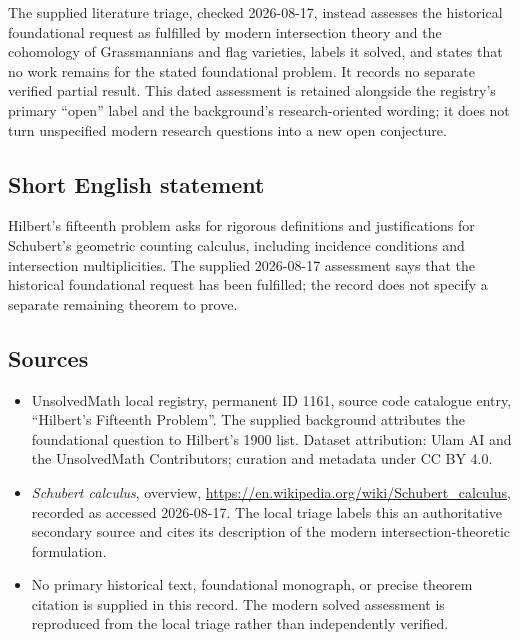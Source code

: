 \documentclass[11pt]{article}
\begin{document}
The supplied literature triage, checked 2026-08-17, instead assesses the historical foundational request as fulfilled by modern intersection theory and the cohomology of Grassmannians and flag varieties, labels it solved, and states that no work remains for the stated foundational problem. It records no separate verified partial result. This dated assessment is retained alongside the registry's primary ``open'' label and the background's research-oriented wording; it does not turn unspecified modern research questions into a new open conjecture.
\subsection{Short English statement}
Hilbert's fifteenth problem asks for rigorous definitions and justifications for Schubert's geometric counting calculus, including incidence conditions and intersection multiplicities. The supplied 2026-08-17 assessment says that the historical foundational request has been fulfilled; the record does not specify a separate remaining theorem to prove.
\subsection{Sources}
\begin{itemize}
\item UnsolvedMath local registry, permanent ID 1161, source code catalogue entry, ``Hilbert's Fifteenth Problem''. The supplied background attributes the foundational question to Hilbert's 1900 list. Dataset attribution: Ulam AI and the UnsolvedMath Contributors; curation and metadata under CC BY 4.0.
\item \emph{Schubert calculus}, overview, \url{https://en.wikipedia.org/wiki/Schubert_calculus}, recorded as accessed 2026-08-17. The local triage labels this an authoritative secondary source and cites its description of the modern intersection-theoretic formulation.
\item No primary historical text, foundational monograph, or precise theorem citation is supplied in this record. The modern solved assessment is reproduced from the local triage rather than independently verified.
\end{itemize}
\end{document}

